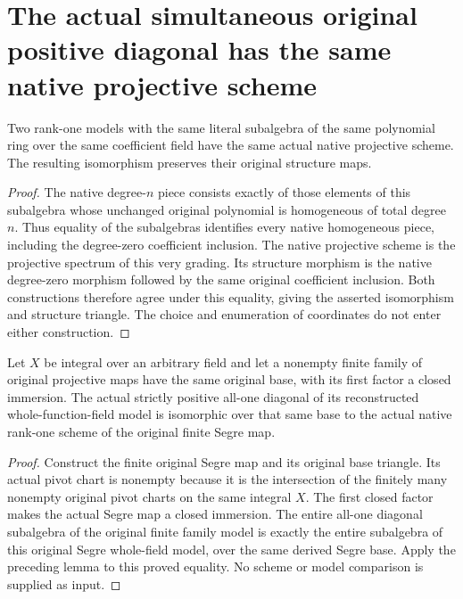 \section{The actual simultaneous original positive diagonal has the same native projective scheme}
\begin{lemma}\label{lem:native-rank-one-same-algebra-scheme}
\leanok
{}
Two rank-one models with the same literal subalgebra of the same polynomial ring over the same coefficient field have the same actual native projective scheme. The resulting isomorphism preserves their original structure maps.
\end{lemma}
\begin{proof}
The native degree-$n$ piece consists exactly of those elements of this subalgebra whose unchanged original polynomial is homogeneous of total degree $n$. Thus equality of the subalgebras identifies every native homogeneous piece, including the degree-zero coefficient inclusion. The native projective scheme is the projective spectrum of this very grading. Its structure morphism is the native degree-zero morphism followed by the same original coefficient inclusion. Both constructions therefore agree under this equality, giving the asserted isomorphism and structure triangle. The choice and enumeration of coordinates do not enter either construction.
\end{proof}
\begin{theorem}\label{thm:original-projective-diagonal-native-scheme}
\leanok
{}
Let $X$ be integral over an arbitrary field and let a nonempty finite family of original projective maps have the same original base, with its first factor a closed immersion. The actual strictly positive all-one diagonal of its reconstructed whole-function-field model is isomorphic over that same base to the actual native rank-one scheme of the original finite Segre map.
\end{theorem}
\begin{proof}
Construct the finite original Segre map and its original base triangle. Its actual pivot chart is nonempty because it is the intersection of the finitely many nonempty original pivot charts on the same integral $X$. The first closed factor makes the actual Segre map a closed immersion. The entire all-one diagonal subalgebra of the original finite family model is exactly the entire subalgebra of this original Segre whole-field model, over the same derived Segre base. Apply the preceding lemma to this proved equality. No scheme or model comparison is supplied as input.
\end{proof}
